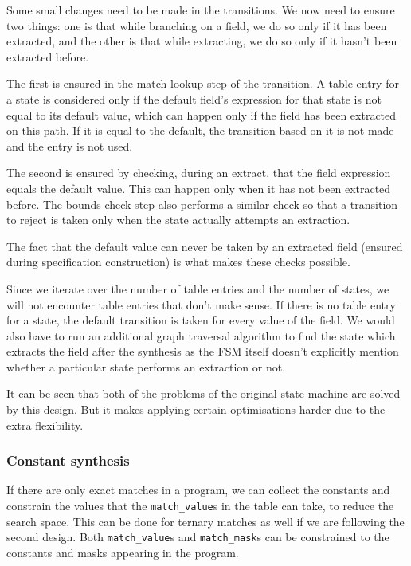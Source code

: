 Some small changes need to be made in the transitions. We now need
to ensure two things: one is that while branching on a field, we
do so only if it has been extracted, and the other is that while
extracting, we do so only if it hasn't been extracted before.

The first is ensured in the match-lookup step of the transition. A
table entry for a state is considered only if the default field's
expression for that state is not equal to its default value, which
can happen only if the field has been extracted on this path. If it
is equal to the default, the transition based on it is not made and
the entry is not used.

The second is ensured by checking, during an extract, that the field
expression equals the default value. This can happen only when it
has not been extracted before. The bounds-check step also performs
a similar check so that a transition to reject is taken only when the state
actually attempts an extraction.

The fact that the default value can never be taken by an extracted
field (ensured during specification construction) is what makes
these checks possible.

Since we iterate over the number of table entries and the number of
states, we will not encounter table entries that don't make sense.
If there is no table entry for a state, the default transition is
taken for every value of the field. 
We would also have to run an additional graph traversal algorithm to find the state 
which extracts the field after the synthesis as the FSM itself doesn't 
explicitly mention whether a particular state performs an extraction or not.  

It can be seen that both of the problems of the original state
machine are solved by this design. But it makes applying certain
optimisations harder due to the extra flexibility.

\subsubsection*{Constant synthesis}

If there are only exact matches in a program, we can collect the
constants and constrain the values that the \texttt{match\_value}s
in the table can take, to reduce the search space. This can be done
for ternary matches as well if we are following the second design.
Both \texttt{match\_value}s and \texttt{match\_mask}s can be
constrained to the constants and masks appearing in the program.

